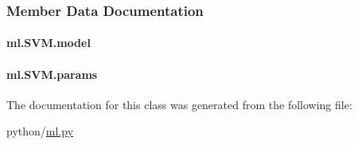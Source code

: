 \subsubsection{Member Data Documentation}
\hypertarget{classml_1_1SVM_a5c0a464afd647ab9ee939f3aa9512dd6}{
\paragraph[{model}]{\setlength{\rightskip}{0pt plus 5cm}ml.\-S\-V\-M.\-model}}\label{classml_1_1SVM_a5c0a464afd647ab9ee939f3aa9512dd6}
\hypertarget{classml_1_1SVM_a7e4bb51252d61327c0ad7675033fe959}{
\paragraph[{params}]{\setlength{\rightskip}{0pt plus 5cm}ml.\-S\-V\-M.\-params}}\label{classml_1_1SVM_a7e4bb51252d61327c0ad7675033fe959}


The documentation for this class was generated from the following file\-:\begin{DoxyCompactItemize}
\item 
python/\hyperlink{ml_8py}{ml.\-py}\end{DoxyCompactItemize}
